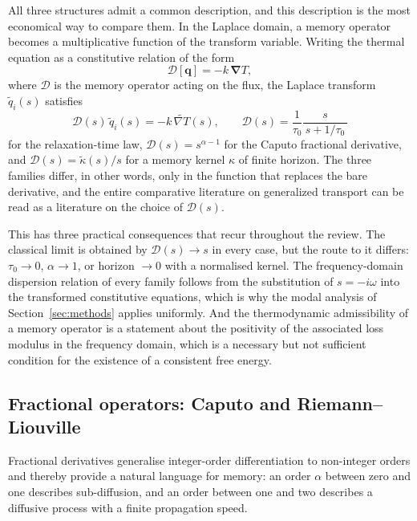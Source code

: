 All three structures admit a common description, and this description is the most economical way to compare them. In the Laplace domain, a memory operator becomes a multiplicative function of the transform variable. Writing the thermal equation as a constitutive relation of the form
\begin{equation}
\mathcal{D}[\bm{q}] = -k\,\bm{\nabla}T,
\label{eq:6.1}
\end{equation}
where $\mathcal{D}$ is the memory operator acting on the flux, the Laplace transform $\tilde{q}_i(s)$ satisfies
\begin{equation}
\mathcal{D}(s)\,\tilde{q}_i(s) = -k\,\widetilde{\nabla T}(s),
\qquad
\mathcal{D}(s) = \frac{1}{\tau_0}\frac{s}{\,s + 1/\tau_0\,}
\label{eq:6.2}
\end{equation}
for the relaxation-time law, $\mathcal{D}(s) = s^{\alpha-1}$ for the Caputo fractional derivative, and $\mathcal{D}(s) = \tilde{\kappa}(s)/s$ for a memory kernel $\kappa$ of finite horizon. The three families differ, in other words, only in the function that replaces the bare derivative, and the entire comparative literature on generalized transport can be read as a literature on the choice of $\mathcal{D}(s)$.

This has three practical consequences that recur throughout the review. The classical limit is obtained by $\mathcal{D}(s)\to s$ in every case, but the route to it differs: $\tau_0\to 0$, $\alpha\to 1$, or horizon $\to 0$ with a normalised kernel. The frequency-domain dispersion relation of every family follows from the substitution of $s = -i\omega$ into the transformed constitutive equations, which is why the modal analysis of Section~\ref{sec:methods} applies uniformly. And the thermodynamic admissibility of a memory operator is a statement about the positivity of the associated loss modulus in the frequency domain, which is a necessary but not sufficient condition for the existence of a consistent free energy.

\subsection{Fractional operators: Caputo and Riemann--Liouville}
\label{sec:6.2}

Fractional derivatives generalise integer-order differentiation to non-integer orders and thereby provide a natural language for memory: an order $\alpha$ between zero and one describes sub-diffusion, and an order between one and two describes a diffusive process with a finite propagation speed.

